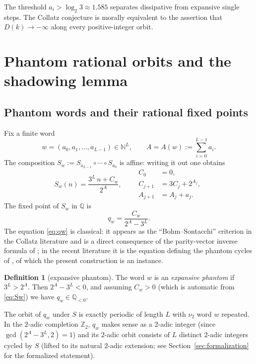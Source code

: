\documentclass[11pt,a4paper]{article}
\theoremstyle{definition}
\newtheorem{definition}[theorem]{Definition}
\newcommand{\Zp}{\mathbb{Z}_2}
\newcommand{\Q}{\mathbb{Q}}
\newcommand{\N}{\mathbb{N}}
\begin{document}
The threshold $a_i > \log_2 3 \approx 1.585$ separates dissipative
from expansive single steps. The Collatz conjecture is morally
equivalent to the assertion that $D(k) \to -\infty$ along every
positive-integer orbit.

\section{Phantom rational orbits and the shadowing lemma}
\label{sec:shadowing}

\subsection{Phantom words and their rational fixed points}
\label{sec:phantom-words}

Fix a finite word
\[
w = (a_0, a_1, \ldots, a_{L-1}) \in \N^L,
\qquad
A = A(w) := \sum_{i=0}^{L-1} a_i.
\]
The composition $S_w := S_{a_{L-1}} \circ \cdots \circ S_{a_0}$ is
affine: writing it out one obtains
\begin{equation}\label{eq:Sw}
S_w(n) = \frac{3^L\, n + C_w}{2^A},
\qquad
\begin{aligned}
C_0 &= 0, \\
C_{j+1} &= 3 C_j + 2^{A_j}, \\
A_{j+1} &= A_j + a_j.
\end{aligned}
\end{equation}
The fixed point of $S_w$ in $\Q$ is
\begin{equation}\label{eq:qw}
q_w = \frac{C_w}{2^A - 3^L}.
\end{equation}
The equation \eqref{eq:qw} is classical: it appears as the
``Bohm--Sontacchi'' criterion in the Collatz literature
\cite[Theorem 1]{siegel2023a} and is a direct consequence of the
parity-vector inverse formula of \cite{lagarias1985,rozier2025}; in
the recent literature it is the equation defining the phantom
cycles of \cite[Def.~7.2]{chang2026}, of which the present
construction is an instance.

\begin{definition}[expansive phantom]
The word $w$ is an \emph{expansive phantom} if $3^L > 2^A$. Then
$2^A - 3^L < 0$, and assuming $C_w > 0$ (which is automatic from
\eqref{eq:Sw}) we have $q_w \in \Q_{<0}$.
\end{definition}

The orbit of $q_w$ under $S$ is exactly periodic of length $L$ with
$\nu_2$ word $w$ repeated. In the $2$-adic completion $\Zp$, $q_w$
makes sense as a $2$-adic integer (since $\gcd(2^A - 3^L, 2)=1$) and
its $2$-adic orbit consists of $L$ distinct $2$-adic integers cycled
by $S$ (lifted to its natural $2$-adic extension; see
Section~\ref{sec:formalization} for the formalized statement).
\end{document}
